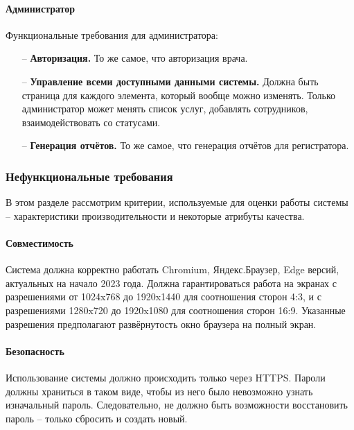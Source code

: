 \documentclass[a4paper,article]{article}
\begin{document}
    \paragraph{Администратор}\label{ТЗ. Администратор}

    Функциональные требования для администратора:

    \begin{itemize}[nolistsep]
        \item[--] \textbf{Авторизация.} То же самое, что авторизация врача.
        \item[--] \textbf{Управление всеми доступными данными системы.} Должна быть страница для каждого элемента, который вообще можно изменять. Только администратор может менять список услуг, добавлять сотрудников, взаимодействовать со статусами.
        \item[--] \textbf{Генерация отчётов.} То же самое, что генерация отчётов для регистратора.
    \end{itemize}

    \newpage

    \subsubsection{Нефункциональные требования}

    В этом разделе рассмотрим критерии, используемые для оценки работы системы -- характеристики производительности и некоторые атрибуты качества.

    \paragraph{Совместимость}\label{ТЗ. Интерфейс пользователя}

    Система должна корректно работать Chromium, Яндекс.Браузер, Edge версий, актуальных на начало 2023 года. Должна гарантироваться работа на экранах с разрешениями от 1024x768 до 1920x1440 для соотношения сторон 4:3, и с разрешениями 1280x720 до 1920x1080 для соотношения сторон 16:9. Указанные разрешения предполагают развёрнутость окно браузера на полный экран.

    \paragraph{Безопасность}\label{ТЗ. Безопасность}

    Использование системы должно происходить только через HTTPS. Пароли должны храниться в таком виде, чтобы из него было невозможно узнать изначальный пароль. Следовательно, не должно быть возможности восстановить пароль -- только сбросить и создать новый.
\end{document}
